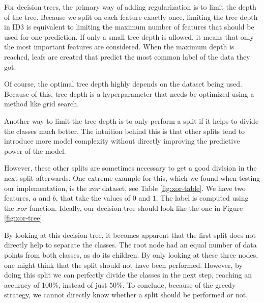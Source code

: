 \documentclass[a4paper]{article}
\begin{document}
For decision trees, the primary way of adding regularization is to limit the depth of the tree. Because we split on each feature exactly once, limiting the tree depth in ID3 is equivalent to limiting the maximum number of features that should be used for one prediction. If only a small tree depth is allowed, it means that only the most important features are considered. When the maximum depth is reached, leafs are created that predict the most common label of the data they got.

Of course, the optimal tree depth highly depends on the dataset being used. Because of this, tree depth is a hyperparameter that needs be optimized using a method like grid search.

Another way to limit the tree depth is to only perform a split if it helps to divide the classes much better. The intuition behind this is that other splits tend to introduce more model complexity without directly improving the predictive power of the model.

However, these other splits are sometimes necessary to get a good division in the next split afterwards. One extreme example for this, which we found when testing our implementation, is the $\mathit{xor}$ dataset, see Table \ref{fig:xor-table}. We have two features, $a$ and $b$, that take the values of $0$ and $1$. The label is computed using the $\mathit{xor}$ function. Ideally, our decision tree should look like the one in Figure \ref{fig:xor-tree}.

By looking at this decision tree, it becomes apparent that the first split does not directly help to separate the classes. The root node had an equal number of data points from both classes, as do its children. By only looking at these three nodes, one might think that the split should not have been performed. However, by doing this split we can perfectly divide the classes in the next step, reaching an accuracy of 100\%, instead of just 50\%. To conclude, because of the greedy strategy, we cannot directly know whether a split should be performed or not.

\begin{figure}
\begin{floatrow}
\end{floatrow}
\end{figure}
\end{document}
